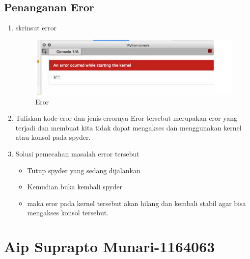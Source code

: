 \subsection{Penanganan Eror}
\begin{enumerate}
\item skrinsut error
\begin{figure}[!htbp]
	\centerline{\includegraphics[width=1\textwidth]{figures/andi/p21.PNG}}
	\caption{Eror}
\end{figure}

\item Tuliskan kode eror dan jenis errornya
\subitem Eror tersebut merupakan eror yang terjadi dan membuat kita tidak dapat mengakses dan menggunakan kernel atau konsol pada spyder.
\item Solusi pemecahan masalah error tersebut
\begin{itemize}
\item Tutup spyder yang sedang dijalankan
\item Kemudian buka kembali spyder
\item maka eror pada kernel tersebut akan hilang dan kembali stabil agar bisa mengakses konsol tersebut.
\end{itemize}
\end{enumerate}


\section{Aip Suprapto Munari-1164063}
